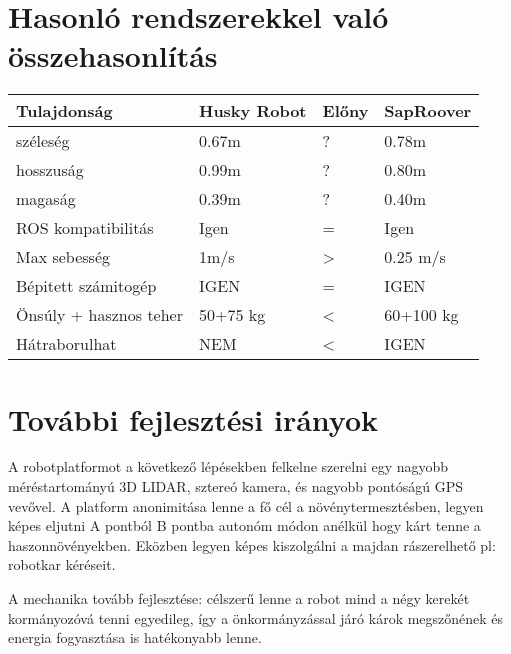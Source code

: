 \section{Hasonló rendszerekkel való összehasonlítás}

\begin{center}
\begin{table}[]
\begin{tabular}{llll}
\hline Tulajdonság & Husky Robot & Előny & SapRoover \\ \hline
 széleség           &    0.67m    &    ?        &   0.78m        \\
   hosszuság        &    0.99m    &   ?        &   0.80m       \\
  magaság           &    0.39m    &   ?        &   0.40m        \\
 ROS 
 kompatibilitás           &    Igen         &   =    &   Igen        \\
   Max sebesség        &    1m/s  &     >   & 0.25 m/s    \\
   Bépitett számitogép        &    IGEN  &   =    & IGEN      \\
   Önsúly + hasznos teher & 50+75 kg &  <   & 60+100 kg \\
   Hátraborulhat & NEM &  <   & IGEN \\
\end{tabular}
\end{table}
\end{center}


\section{További fejlesztési irányok}

A robotplatformot a következő lépésekben felkelne szerelni egy nagyobb méréstartományú 3D LIDAR, sztereó kamera, és nagyobb pontóságú GPS vevővel.
A platform  anonimitása lenne a fő cél a növénytermesztésben, legyen képes eljutni A pontból B pontba autonóm módon anélkül hogy kárt tenne a haszonnövényekben. Eközben legyen képes kiszolgálni a majdan rászerelhető pl: robotkar kéréseit.

A mechanika tovább fejlesztése: célszerű lenne a robot mind a négy kerekét kormányozóvá tenni egyedileg, így a önkormányzással járó károk megszőnének és energia fogyasztása is hatékonyabb lenne.
